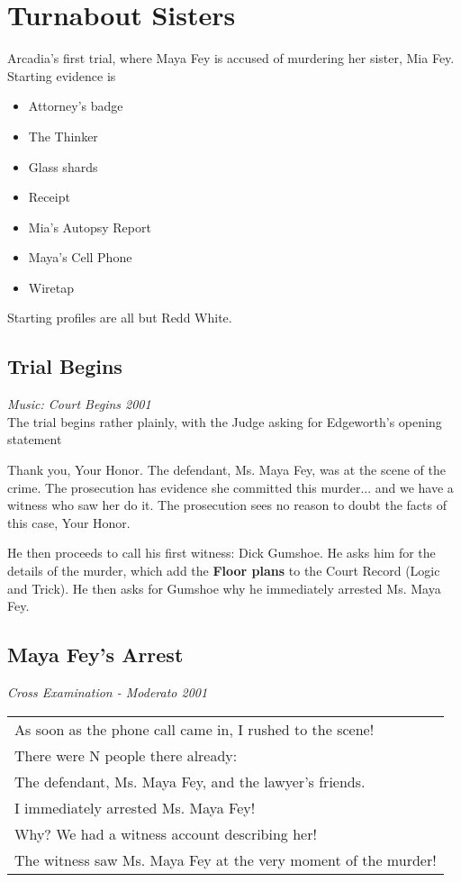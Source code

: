 \section{Turnabout Sisters}

Arcadia's first trial, where Maya Fey is accused of murdering her sister, Mia Fey. Starting evidence is 
\begin{itemize}
\item Attorney's badge
\item The Thinker
\item Glass shards
\item Receipt
\item Mia's Autopsy Report
\item Maya's Cell Phone
\item Wiretap
\end{itemize}

Starting profiles are all but Redd White.

\subsection{Trial Begins}
\textit{Music: Court Begins 2001}\\
The trial begins rather plainly, with the Judge asking for Edgeworth's opening statement
\begin{center}
Thank you, Your Honor. The defendant, Ms. Maya Fey, was at the scene of the crime. The prosecution has evidence she committed this murder... and we have a witness who saw her do it. The prosecution sees no reason to doubt the facts of this case, Your Honor. 
\end{center}

He then proceeds to call his first witness: Dick Gumshoe. He asks him for the details of the murder, which add the \textbf{Floor plans} to the Court Record (Logic and Trick). He then asks for Gumshoe why he immediately arrested Ms. Maya Fey.

\subsection{Maya Fey's Arrest}
\textit{Cross Examination - Moderato 2001}\\
\begin{tabular}{p{11cm}}
As soon as the phone call came in, I rushed to the scene!\\
There were N people there already:\\
The defendant, Ms. Maya Fey, and the lawyer's friends. \\
I immediately arrested Ms. Maya Fey!\\
Why? We had a witness account describing her!\\
The witness saw Ms. Maya Fey at the very moment of the murder!\end{tabular}

